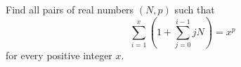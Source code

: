 Find all pairs of real numbers \((N,p)\) such that
\[
\sum_{i=1}^{x}\left(1+\sum_{j=0}^{i-1} jN\right)=x^p
\]
for every positive integer \(x\).

